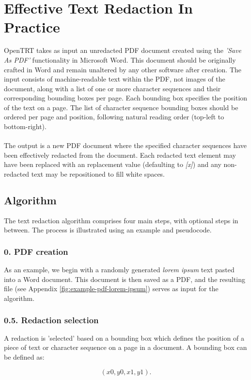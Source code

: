 \section{Effective Text Redaction In Practice}
OpenTRT takes as input an unredacted PDF document created using the \textit{'Save As PDF'} functionality in Microsoft Word. This document should be originally crafted in Word and remain unaltered by any other software after creation. The input consists of machine-readable text within the PDF, not images of the document, along with a list of one or more character sequences and their corresponding bounding boxes per page. Each bounding box specifies the position of the text on a page. The list of character sequence bounding boxes should be ordered per page and position, following natural reading order (top-left to bottom-right).
\\\\
The output is a new PDF document where the specified character sequences have been effectively redacted from the document. Each redacted text element may have been replaced with an replacement value (defaulting to \textit{[x]}) and any non-redacted text may be repositioned to fill white spaces. 


\subsection{Algorithm}
The text redaction algorithm comprises four main steps, with optional steps in between. The process is illustrated using an example and pseudocode.

\subsubsection{0. PDF creation}
As an example, we begin with a randomly generated \textit{lorem ipsum} text pasted into a Word document. This document is then saved as a PDF, and the resulting file (see Appendix \ref{fig:example-pdf-lorem-ipsum}) serves as input for the algorithm.

\subsubsection{0.5. Redaction selection}
A redaction is 'selected' based on a bounding box which defines the position of a piece of text or character sequence on a page in a document. A bounding box can be defined as:

\[ (x0, y0, x1, y1). \]

